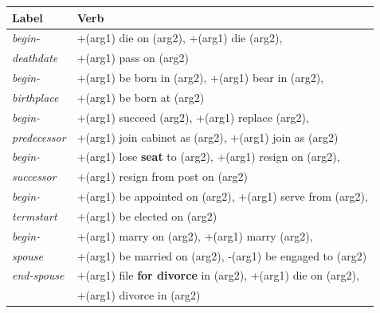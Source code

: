 \begin{table}
\begin{scriptsize}
\begin{center}
\begin{tabular}{|l|l|}
\hline
Label & Verb \\
\hline
\textit{begin-} &+(arg1) die on (arg2), +(arg1) die (arg2), \\
\textit{deathdate}& +(arg1) pass on (arg2) \\
\hline
\textit{begin-} &+(arg1) be born in (arg2), +(arg1) bear in (arg2), \\
\textit{birthplace}&+(arg1) be born at (arg2) \\
\hline
\textit{begin-} &+(arg1) succeed (arg2), +(arg1) replace (arg2), \\
\textit{predecessor}& +(arg1) join cabinet as (arg2), +(arg1) join as (arg2) \\
\hline
\textit{begin-} &+(arg1) lose \textbf{seat} to (arg2), +(arg1) resign on (arg2), \\
\textit{successor}& +(arg1) resign from post on (arg2) \\ %
\hline
\textit{begin-} &+(arg1) be appointed on (arg2), +(arg1) serve from (arg2), \\
\textit{termstart}& +(arg1) be elected on (arg2) \\
\hline
\textit{begin-} &+(arg1) marry on (arg2), +(arg1) marry (arg2), \\
\textit{spouse}& +(arg1) be married on (arg2), -(arg1) be engaged to (arg2) \\
\hline
\textit{end-spouse} &+(arg1) file \textbf{for divorce} in (arg2), +(arg1) die on (arg2), \\
& +(arg1) divorce in (arg2) \\%

\end{tabular}
\end{center}
\end{scriptsize}
\end{table}
